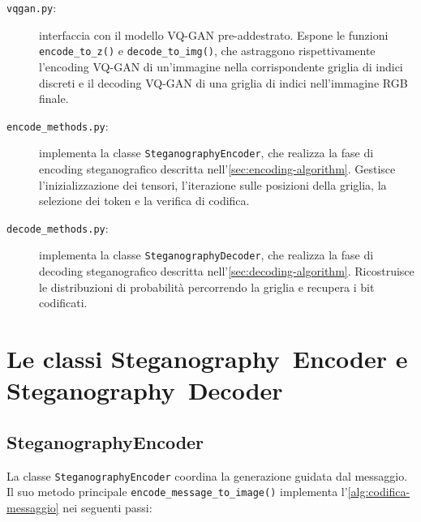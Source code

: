\begin{description}
	\item[\texttt{vqgan.py}:] interfaccia con il modello VQ-GAN pre-addestrato. Espone le funzioni \texttt{encode\_to\_z()} e \texttt{decode\_to\_img()}, che astraggono rispettivamente l'encoding VQ-GAN di un'immagine nella corrispondente griglia di indici discreti e il decoding VQ-GAN di una griglia di indici nell'immagine RGB finale.
	
	\item[\texttt{encode\_methods.py}:] implementa la classe \texttt{SteganographyEncoder}, che realizza la fase di encoding steganografico descritta nell'\autoref{sec:encoding-algorithm}. Gestisce l'inizializzazione dei tensori, l'iterazione sulle posizioni della griglia, la selezione dei token e la verifica di codifica.
	
	\item[\texttt{decode\_methods.py}:] implementa la classe \texttt{SteganographyDecoder}, che realizza la fase di decoding steganografico descritta nell'\autoref{sec:decoding-algorithm}. Ricostruisce le distribuzioni di probabilità percorrendo la griglia e recupera i bit codificati.
\end{description}

\section{Le classi Steganography~Encoder e Steganography~Decoder}
\label{sec:classi-encoder-decoder}

\subsection{SteganographyEncoder}

La classe \texttt{SteganographyEncoder} coordina la generazione guidata dal messaggio. Il suo metodo principale \texttt{encode\_message\_to\_image()} implementa l'\autoref{alg:codifica-messaggio} nei seguenti passi:

